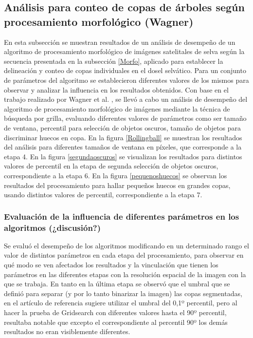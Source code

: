 \subsection{Análisis para conteo de copas de árboles según procesamiento morfológico (Wagner)}
En esta subsección se muestran resultados de un análisis de desempeño de un algoritmo de procesamiento morfológico de imágenes satelitales de selva según la secuencia presentada en la subsección \ref{Morfo}, aplicado para establecer la delineación y conteo de copas individuales en el dosel selvático. Para un conjunto de parámetros del algoritmo se establecieron diferentes valores de los mismos para observar y analizar la influencia en los resultados obtenidos.
Con base en el trabajo realizado por Wagner et al. \cite{hubert_wagner_individual_2018}, se llevó a cabo un análisis de desempeño del algoritmo de procesamiento morfológico de imágenes mediante la técnica de búsqueda por grilla, evaluando diferentes valores de parámetros como ser tamaño de ventana, percentil para selección de objetos oscuros, tamaño de objetos para discriminar huecos en copa. En la figura \ref{Rollingball} se muestran los resultados del análisis para diferentes tamaños de ventana en  píxeles, que corresponde a la etapa 4. En la figura \ref{segundaoscuros} se visualizan los resultados para distintos valores de percentil en la etapa de segunda selección de objetos oscuros, correspondiente a la etapa 6. En la figura \ref{pequenoshuecos} se observan los resultados del procesamiento para hallar pequeños huecos en grandes copas, usando distintos valores de percentil, correspondiente a la etapa 7. 



\subsubsection{Evaluación de la influencia de diferentes parámetros en los algoritmos (¿discusión?)}
Se evaluó el desempeño de los algoritmos modificando en un determinado rango el valor de distintos parámetros en cada etapa del procesamiento, para observar en qué modo se ven afectados los resultados y la vinculación que tienen los parámetros en las diferentes etapas con la resolución espacial de la imagen con la que se trabaja. En tanto en la última etapa se observó que el umbral
que se definió para separar (y por lo tanto binarizar la imagen) las copas segmentadas, en el artículo de referencia sugiere utilizar el umbral del 0,1º percentil, pero al hacer la prueba de Gridsearch con diferentes valores hasta el 90º percentil, resultaba notable que excepto el correspondiente al percentil 90º los demás resultados no eran visiblemente
diferentes.



